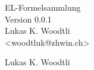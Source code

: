 \begin{titlepage}
\vspace*{7cm}
\begin{center}
\Huge
EL-Formelsammlung\\
\vspace{1cm}
\large
Version 0.0.1\\
\vspace{2cm}
Lukas K. Woodtli\\
<woodtluk@zhwin.ch>\\
\end{center}
\normalsize
\vfill
\footnotesize\textcopyright Lukas K. Woodtli
\end{titlepage}